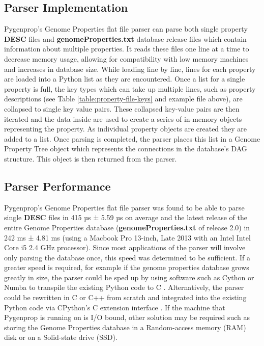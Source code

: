 \subsection{Parser Implementation}

Pygenprop's Genome Properties flat file parser can parse both single property \textbf{DESC} files and \textbf{genomeProperties.txt} database release files which contain information about multiple properties. It reads these files one line at a time to decrease memory usage, allowing for compatibility with low memory machines and increases in database size. While loading line by line, lines for each property are loaded into a Python list as they are encountered. Once a list for a single property is full, the key types which can take up multiple lines, such as property descriptions (see Table \ref{table:property-file-keys} and example file above), are collapsed to single key value pairs. These collapsed key-value pairs are then iterated and the data inside are used to create a series of in-memory objects representing the property. As individual property objects are created they are added to a list. Once parsing is completed, the parser places this list in a Genome Property Tree object which represents the connections in the database's DAG structure. This object is then returned from the parser.

\subsection{Parser Performance}

Pygenprop's Genome Properties flat file parser was found to be able to parse single \textbf{DESC} files in 415 µs ± 5.59 µs on average and the latest release of the entire Genome Properties database (\textbf{genomeProperties.txt} of release 2.0) in 242 ms ± 4.81 ms (using a Macbook Pro 13-inch, Late 2013 with an Intel Intel Core i5 2.4 GHz processor). Since most applications of the parser will involve only parsing the database once, this speed was determined to be sufficient. If a greater speed is required, for example if the genome properties database grows greatly in size, the parser could be sped up by using software such as Cython \cite{behnel2010cython} or Numba \cite{lam2015numba} to transpile the existing Python code to C \cite{kernighan2006c}. Alternatively, the parser could be rewritten in C or C++ \cite{ISO:1998:IIP} from scratch and integrated into the existing Python code via CPython's  C extension interface \cite{van1995python}. If the machine that Pygenprop is running on is I/O bound, other solution may be required such as storing the Genome Properties database in a Random-access memory (RAM) disk or on a Solid-state drive (SSD). \\


